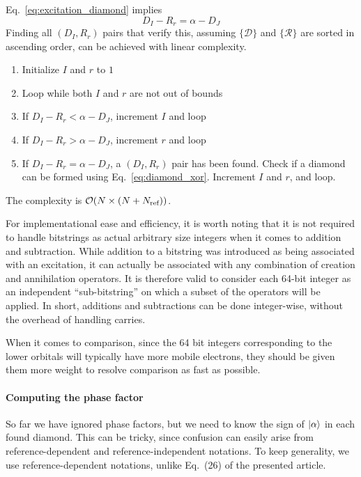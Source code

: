 \documentclass[./thesis.tex]{subfiles}
\begin{document}
Eq.~\eqref{eq:excitation_diamond} implies
\begin{equation}
D_I - R_r = \alpha - D_J 
\end{equation}
Finding all $(D_I, R_r)$ pairs that verify this, assuming $\{\mathcal{D}\}$ and $\{\mathcal{R}\}$ are sorted in ascending order, can be achieved with linear complexity.


\begin{enumerate}
\item
Initialize $I$ and $r$ to $1$
\item
Loop while both $I$ and $r$ are not out of bounds
\item
If $D_I - R_r < \alpha - D_J$, increment $I$ and loop
\item
If $D_I - R_r > \alpha - D_J$, increment $r$ and loop
\item
If $D_I - R_r = \alpha - D_J$, a $(D_I, R_r)$ pair has been found. Check if a diamond can be formed using Eq.~\eqref{eq:diamond_xor}. Increment $I$ and $r$, and loop.
\end{enumerate}
The complexity is $\mathcal{O}(N \times (N+{N_\text{ref}}))$.


For implementational ease and efficiency, it is worth noting that it is not required to handle bitstrings as actual arbitrary size integers when it comes to addition and subtraction. While addition to a bitstring was introduced as being associated with an excitation, it can actually be associated with any combination of creation and annihilation operators. It is therefore valid to consider each 64-bit integer as an independent ``sub-bitstring'' on which a subset of the operators will be applied. In short, additions and subtractions can be done integer-wise, without the overhead of handling carries.

When it comes to comparison, since the 64 bit integers corresponding to the lower orbitals will typically have more mobile electrons, they should be given them more weight to resolve comparison as fast as possible.

\paragraph{Computing the phase factor}



So far we have ignored phase factors, but we need to know the sign of ${\ket{\alpha}}$ in each found diamond. This can be tricky, since confusion can easily arise from reference-dependent and reference-independent notations. To keep generality, we use reference-dependent notations, unlike Eq.~(26) of the presented article.
\end{document}
